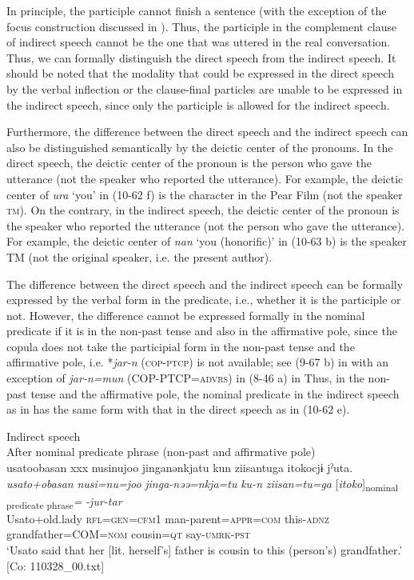 In principle, the participle cannot finish a sentence (with the exception of the focus construction discussed in ). Thus, the participle in the complement clause of indirect speech cannot be the one that was uttered in the real conversation. Thus, we can formally distinguish the direct speech from the indirect speech. It should be noted that the modality that could be expressed in the direct speech by the verbal inflection or the clause-final particles are unable to be expressed in the indirect speech, since only the participle is allowed for the indirect speech.

  Furthermore, the difference between the direct speech and the indirect speech can also be distinguished semantically by the deictic center of the pronouns. In the direct speech, the deictic center of the pronoun is the person who gave the utterance (not the speaker who reported the utterance). For example, the deictic center of \textit{ura} ‘you’ in (10-62 f) is the character in the Pear Film (not the speaker \textsc{tm}). On the contrary, in the indirect speech, the deictic center of the pronoun is the speaker who reported the utterance (not the person who gave the utterance). For example, the deictic center of \textit{nan} ‘you (honorific)’ in (10-63 b) is the speaker TM (not the original speaker, i.e. the present author).

The difference between the direct speech and the indirect speech can be formally expressed by the verbal form in the predicate, i.e., whether it is the participle or not. However, the difference cannot be expressed formally in the nominal predicate if it is in the non-past tense and also in the affirmative pole, since the copula does not take the participial form in the non-past tense and the affirmative pole, i.e. *\textit{jar-n} (\textsc{cop}-\textsc{ptcp}) is not available; see (9-67 b) in  with an exception of \textit{jar-n=mun} (COP-PTCP=\textsc{advrs}) in (8-46 a) in  Thus, in the non-past tense and the affirmative pole, the nominal predicate in the indirect speech as in  has the same form with that in the direct speech as in (10-62 e).

\ea\label{ex:10.64}   Indirect speech\\
  After nominal predicate phrase (non-past and affirmative pole)\\
      \glll    usato{\textbar}obasan{\textbar}  xxx  nusinujoo  jinganənkjatu  kun  ziisantuga  {\textbar}itoko{\textbar}cjɨ   jˀuta.\\
    \textit{usato+obasan}  {}  \textit{nusi=nu=joo}  \textit{jinga-nəə=nkja=tu}  \textit{ku-n}  \textit{ziisan=tu=ga}  [\textit{itoko}]\textsubscript{nominal predicate phrase}\textit{=} \textit{-jur-tar}\\
    Usato+old.lady  {}  \textsc{rfl}=\textsc{gen}=\textsc{cfm}1  man-parent=\textsc{appr}=\textsc{com} this-\textsc{adnz}  grandfather=COM=\textsc{nom}  cousin=\textsc{qt}   say-\textsc{umrk}-\textsc{pst}\\
    \glt ‘Usato said that her [lit. herself’s] father is cousin to this (person’s) grandfather.’ [Co: 110328\_00.txt]
\z

